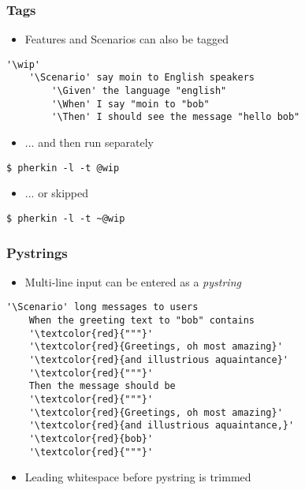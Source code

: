 \documentclass[10pt]{vcs_beamer}
\makeatletter
\newcommand{\Scenario}{\color{BlueViolet}{Scenario:}}
\newcommand{\Given}{\color{DarkOrange}{Given}}
\newcommand{\When}{\color{RoyalBlue}{When}}
\newcommand{\Then}{\color{ForestGreen}{Then}}
\newcommand{\wip}{\color{BlueViolet}{@wip}}
\makeatother
\begin{document}
\begin{frame}[fragile]
\frametitle{Tags}

\begin{itemize}
    \item Features and Scenarios can also be tagged
\end{itemize}

\begin{lstlisting}[escapeinside='']
    '\wip'
    '\Scenario' say moin to English speakers
        '\Given' the language "english"
        '\When' I say "moin to "bob"
        '\Then' I should see the message "hello bob"
\end{lstlisting}

\begin{itemize}
    \item ... and then run separately
\end{itemize}
\begin{lstlisting}
$ pherkin -l -t @wip
\end{lstlisting}

\begin{itemize}
    \item ... or skipped
\end{itemize}
\begin{lstlisting}
$ pherkin -l -t ~@wip
\end{lstlisting}

\end{frame}

\begin{frame}[fragile]
\frametitle{Pystrings}

\begin{itemize}
    \item Multi-line input can be entered as a \emph{pystring}
\end{itemize}

\begin{lstlisting}[escapeinside='']
  '\Scenario' long messages to users
    When the greeting text to "bob" contains
    '\textcolor{red}{"""}'
    '\textcolor{red}{Greetings, oh most amazing}'
    '\textcolor{red}{and illustrious aquaintance}'
    '\textcolor{red}{"""}'
    Then the message should be
    '\textcolor{red}{"""}'
    '\textcolor{red}{Greetings, oh most amazing}'
    '\textcolor{red}{and illustrious aquaintance,}'
    '\textcolor{red}{bob}'
    '\textcolor{red}{"""}'
\end{lstlisting}

\begin{itemize}
    \item Leading whitespace before pystring is trimmed
\end{itemize}

\end{frame}
\end{document}
